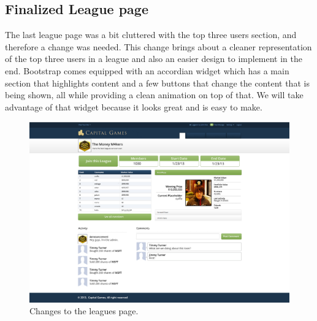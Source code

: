 \subsection{Finalized League page}
The last league page was a bit cluttered with the top three users section, and therefore a change was needed. This change brings about a cleaner representation of the top three users in a league and also an easier design to implement in the end. Bootstrap comes equipped with an accordian widget which has a main section that highlights content and a few buttons that change the content that is being shown, all while providing a clean animation on top of that. We will take advantage of that widget because it looks great and is easy to make.
\begin{figure}[H]
\centering
\includegraphics[width=5.5in]{./mockups/JPEG/Leaguesfourth.jpg}
\caption{Changes to the leagues page.}
\end{figure}

